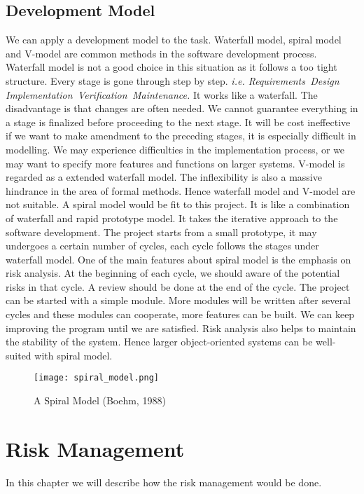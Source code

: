 \documentclass[a4paper,11pt]{report}
\begin{document}
\section{Development Model}
We can apply a development model to the task. Waterfall model, spiral model and V-model are common methods in the software development process. Waterfall model is not a good choice in this situation as it follows a too tight structure. Every stage is gone through step by step. \textit{i.e. Requirements \rightarrow \,Design \rightarrow \,Implementation \rightarrow \,Verification \rightarrow \,Maintenance.} It works like a waterfall. The disadvantage is that changes are often needed. We cannot guarantee everything in a stage is finalized before proceeding to the next stage. It will be cost ineffective if we want to make amendment to the preceding stages, it is especially difficult in modelling. We may experience difficulties in the implementation process, or we may want to specify more features and functions on larger systems. V-model is regarded as a extended waterfall model. The inflexibility is also a massive hindrance in the area of formal methods. Hence waterfall model and V-model are not suitable. 
\vspace{0.2cm} 
\FloatBarrier A spiral model would be fit to this project. It is like a combination of waterfall and rapid prototype model. It takes the iterative approach to the software development. The project starts from a small prototype, it may undergoes a certain number of cycles, each cycle follows the stages under waterfall model. One of the main features about spiral model is the emphasis on risk analysis. At the beginning of each cycle, we should aware of the potential risks in that cycle. A review should be done at the end of the cycle. The project can be started with a simple module. More modules will be written after several cycles and these modules can cooperate, more features can be built. We can keep improving the program until we are satisfied. Risk analysis also helps to maintain the stability of the system. 
Hence larger object-oriented systems can be well-suited with spiral model.
\begin{figure}[!ht]
  \centering
      \texttt{[image: spiral\_model.png]}
  \caption{A Spiral Model (Boehm, 1988)}
\end{figure}
\newpage
\chapter{Risk Management}
In this chapter we will describe how the risk management would be done.
\end{document}
